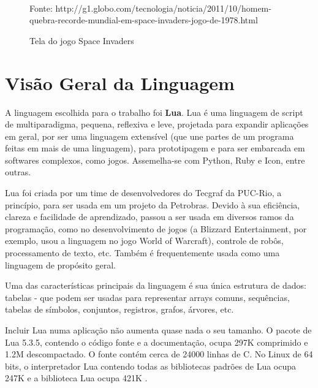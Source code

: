 \documentclass[rel_mlp]{iiufrgs}
\newcommand{\fonte}[1]{\\Fonte: {#1}}
\begin{document}
\begin{figure}[H]
     \centering
     \caption{Tela do jogo Space Invaders}
     \label{fig:Figura1}
     \fonte{http://g1.globo.com/tecnologia/noticia/2011/10/homem-quebra-recorde-mundial-em-space-invaders-jogo-de-1978.html}
 \end{figure}


\chapter{Visão Geral da Linguagem} \label{Linguagem}

A linguagem escolhida para o trabalho foi \textbf{Lua}. Lua é uma linguagem de script de multiparadigma, pequena, reflexiva e leve, projetada para expandir aplicações em geral, por ser uma linguagem extensível (que une partes de um programa feitas em mais de uma linguagem), para prototipagem e para ser embarcada em softwares complexos, como jogos. Assemelha-se com Python, Ruby e Icon, entre outras.

Lua foi criada por um time de desenvolvedores do Tecgraf da PUC-Rio, a princípio, para ser usada em um projeto da Petrobras. Devido à sua eficiência, clareza e facilidade de aprendizado, passou a ser usada em diversos ramos da programação, como no desenvolvimento de jogos (a Blizzard Entertainment, por exemplo, usou a linguagem no jogo World of Warcraft), controle de robôs, processamento de texto, etc. Também é frequentemente usada como uma linguagem de propósito geral.

Uma das características principais da linguagem é sua única estrutura de dados: tabelas - que podem ser usadas para representar arrays comuns, sequências, tabelas de símbolos, conjuntos, registros, grafos, árvores, etc.

Incluir Lua numa aplicação não aumenta quase nada o seu tamanho. O pacote de Lua 5.3.5, contendo o código fonte e a documentação, ocupa 297K comprimido e 1.2M descompactado. O fonte contém cerca de 24000 linhas de C. No Linux de 64 bits, o interpretador Lua contendo todas as bibliotecas padrões de Lua ocupa 247K e a biblioteca Lua ocupa 421K \cite{AboutLua}.
\end{document}
